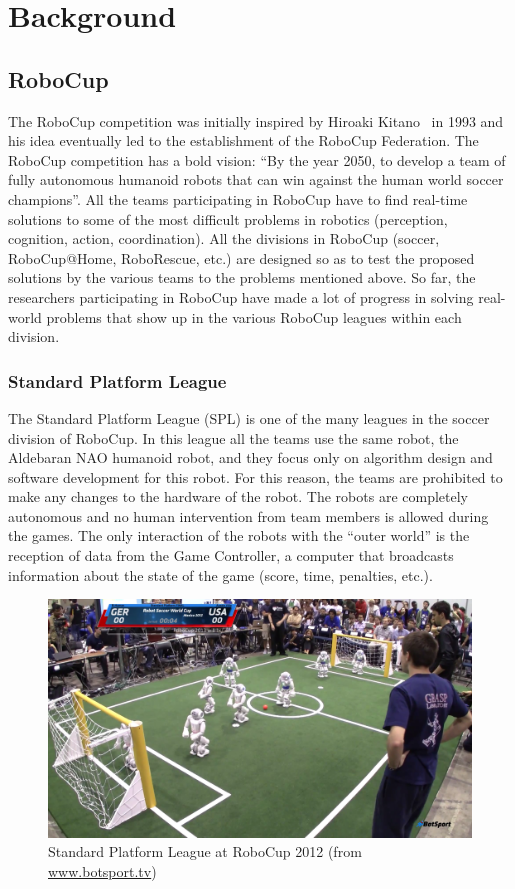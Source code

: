 \chapter{Background}
\label{Background}
\section{RoboCup}
The RoboCup competition was initially inspired by Hiroaki Kitano~\cite{robocup} in 1993 and his idea eventually led to the establishment of the RoboCup Federation. The RoboCup competition has a bold vision: ``By the year 2050, to develop a team of fully autonomous humanoid robots that can win against the human world soccer champions''. All the teams participating in RoboCup have to find real-time solutions to some of the most difficult problems in robotics (perception, cognition, action, coordination). All the divisions in RoboCup (soccer, RoboCup@Home, RoboRescue, etc.) are designed so as to test the proposed solutions by the various teams to the problems mentioned above. So far, the researchers participating in RoboCup have made a lot of progress in solving real-world problems that show up in the various RoboCup leagues within each division.

\subsection{Standard Platform League}
The Standard Platform League (SPL) is one of the many leagues in the soccer division of RoboCup. In this league all the teams use the same robot, the Aldebaran NAO humanoid robot, and they focus only on algorithm design and software development for this robot. For this reason, the teams are prohibited to make any changes to the hardware of the robot. The robots are completely autonomous and no human intervention from team members is allowed during the games. The only interaction of the robots with the ``outer world'' is the reception of data from the Game Controller, a computer that broadcasts information about the state of the game (score, time, penalties, etc.).

\begin{figure}[t!]
	\begin{center}
		\includegraphics[width=.9\textwidth]{Figures/spl2012.png}
 		\caption{Standard Platform League at RoboCup 2012 (from \url{www.botsport.tv})}
 		\label{fig:RoboCup SPL}
	\end{center}
\end{figure}

